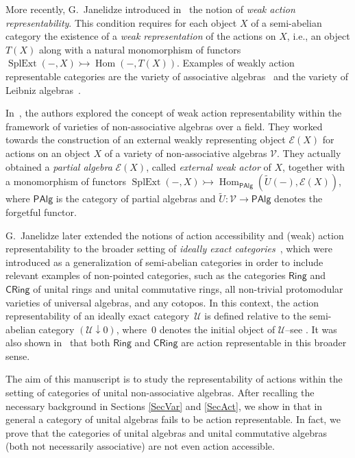 \documentclass[reqno,a4paper]{amsart}
\theoremstyle{plain}
\theoremstyle{definition}
\theoremstyle{remark}
\numberwithin{equation}{section}
\newcommand{\E}{\mathcal{E}}
\newcommand{\V}{\mathcal{V}}
\newcommand{\U}{\mathcal{U}}
\DeclareMathOperator{\Hom}{Hom}
\DeclareMathOperator{\SplExt}{SplExt}
\newcommand{\PAlg}{\ensuremath{\mathsf{PAlg}}}
\newcommand{\Ring}{\ensuremath{\mathsf{Ring}}}
\newcommand{\CRing}{\ensuremath{\mathsf{CRing}}}
\begin{document}
More recently, G.~Janelidze introduced in~\cite{WRA} the notion of \emph{weak action representability}. This condition requires for each object $X$ of a semi-abelian category the existence of a \emph{weak representation} of the actions on $X$, i.e., an object $T(X)$ along with a natural monomorphism of functors $\SplExt(-,X) \rightarrowtail \Hom(-,T(X))$. Examples of weakly action representable categories are the variety of associative algebras~\cite{WRA} and the variety of Leibniz algebras~\cite{CigoliManciniMetere}.

In~\cite{WRAAlg}, the authors explored the concept of weak action representability within the framework of varieties of non-associative algebras over a field. They worked towards the construction of an external weakly representing object $\E(X)$ for actions on an object $X$ of a variety of non-associative algebras $\V$. They actually obtained a \emph{partial algebra} $\E(X)$, called \emph{external weak actor} of $X$, together with a monomorphism of functors $\SplExt(-,X) \rightarrowtail \Hom_\PAlg(\widetilde{U}(-),\E(X))$, where $\PAlg$ is the category of partial algebras and $\widetilde{U} \colon \V \to \PAlg$ denotes the forgetful functor.

G.~Janelidze later extended the notions of action accessibility and (weak) action representability to the broader setting of \emph{ideally exact categories}~\cite{IdeallyExact}, which were introduced as a generalization of semi-abelian categories in order to include relevant examples of non-pointed categories, such as the categories $\Ring$ and $\CRing$ of unital rings and unital commutative rings, all non-trivial protomodular varieties of universal algebras, and any cotopos. In this context, the action representability of an ideally exact category~$\U$ is defined relative to the semi-abelian category $(\U \downarrow 0)$, where~$0$ denotes the initial object of $\U$--see . It was also shown in~\cite{IdeallyExact} that both $\Ring$ and $\CRing$ are action representable in this broader sense.

The aim of this manuscript is to study the representability of actions within the setting of categories of unital non-associative algebras. After recalling the necessary background in Sections \ref{SecVar} and \ref{SecAct}, we show in  that in general a category of unital algebras fails to be action representable. In fact, we prove that the categories of unital algebras and unital commutative algebras (both not necessarily associative) are not even action accessible. 
\end{document}
